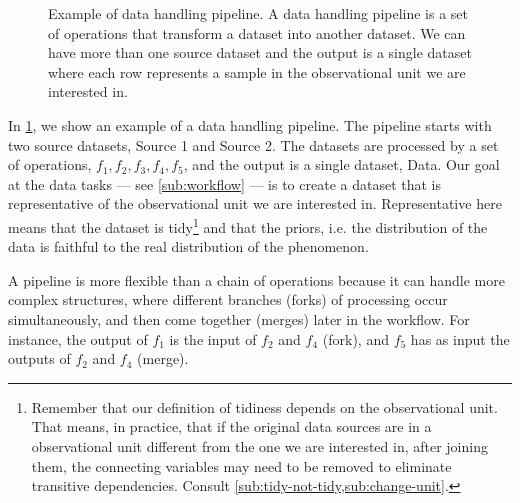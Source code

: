 \begin{figure}
  \centering
  \caption{
  Example of data handling pipeline.
  A data handling pipeline is a set of operations that transform a dataset into
  another dataset.  We can have more than one source dataset and the output is a single
  dataset where each row represents a sample in the observational unit we are interested
  in.
  }
  \label{fig:pipeline}
\end{figure}

In \cref{fig:pipeline}, we show an example of a data handling pipeline.  The pipeline
starts with two source datasets, Source 1 and Source 2.  The datasets are processed by a
set of operations, $f_1, f_2, f_3, f_4, f_5$, and the output is a single dataset,
Data.  Our goal at the data tasks --- see \cref{sub:workflow} --- is to create a dataset
that is representative of the observational unit we are interested in.  Representative
here means that the dataset is tidy\footnote{Remember that our definition of tidiness
depends on the observational unit.  That means, in practice, that if the original data
sources are in a observational unit different from the one we are interested in, after
joining them, the connecting variables may need to be removed to eliminate transitive
dependencies.  Consult \cref{sub:tidy-not-tidy,sub:change-unit}.} and that the priors,
i.e. the distribution of the data is faithful to the real distribution of the phenomenon.

A pipeline is more flexible than a chain of operations because it can handle more complex
structures, where different branches (forks) of processing occur simultaneously, and then
come together (merges) later in the workflow.  For instance, the output of $f_1$ is the
input of $f_2$ and $f_4$ (fork), and $f_5$ has as input the outputs of $f_2$ and $f_4$
(merge).

